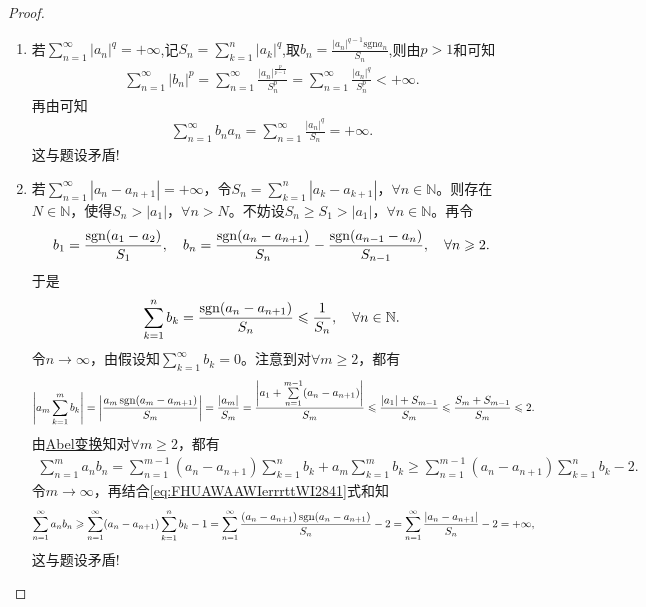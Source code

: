 \documentclass[../../main.tex]{subfiles}%
\begin{document}
\begin{proof}
\begin{enumerate}[(1)]
\item 若$\sum_{n=1}^{\infty}{| a_n |^q}=+\infty$,记$S_n=\sum_{k=1}^n{| a_k |^q}$,取$b_n=\frac{| a_n |^{q-1}\mathrm{sgn} a_n}{S_n}$,则由$p>1$和可知
\begin{align*}
\sum_{n=1}^{\infty}{| b_n |^p}=\sum_{n=1}^{\infty}{\frac{| a_n |^{\frac{p}{p-1}}}{S_{n}^{p}}}=\sum_{n=1}^{\infty}{\frac{| a_n |^q}{S_{n}^{p}}}<+\infty.
\end{align*}
再由可知
\begin{align*}
\sum_{n=1}^{\infty}{b_n a_n}=\sum_{n=1}^{\infty}{\frac{| a_n |^q}{S_n}}=+\infty.
\end{align*}
这与题设矛盾!

\item 若$\sum\limits_{n=1}^{\infty} |a_n - a_{n+1}| = +\infty$，令$S_n = \sum\limits_{k=1}^{n} |a_k - a_{k+1}|$，$\forall n\in \mathbb{N}$。则存在$N\in \mathbb{N}$，使得$S_n > |a_1|$，$\forall n > N$。不妨设$S_n \geqslant S_1 > |a_1|$，$\forall n\in \mathbb{N}$。再令
\begin{align*}
b_1 = \frac{\operatorname{sgn} (a_1 - a_2)}{S_1},\quad b_n = \frac{\operatorname{sgn} (a_n - a_{n+1})}{S_n} - \frac{\operatorname{sgn} (a_{n-1} - a_n)}{S_{n-1}},\quad \forall n\geqslant 2.
\end{align*}
于是
\begin{align*}
\sum\limits_{k=1}^{n} b_k = \frac{\operatorname{sgn} (a_n - a_{n+1})}{S_n} \leqslant \frac{1}{S_n},\quad \forall n\in \mathbb{N}.
\end{align*}
令$n\to\infty$，由假设知$\sum\limits_{k=1}^{\infty} b_k = 0$。注意到对$\forall m\geqslant 2$，都有
\begin{align}
\left| a_m \sum\limits_{k=1}^{m} b_k \right| = \left| \frac{a_m \operatorname{sgn} (a_m - a_{m+1})}{S_m} \right| = \frac{|a_m|}{S_m} = \frac{\left| a_1 + \sum\limits_{n=1}^{m-1} (a_n - a_{n+1}) \right|}{S_m} \leqslant \frac{|a_1| + S_{m-1}}{S_m} \leqslant\frac{S_m + S_{m-1}}{S_m}  \leqslant 2.
\label{eq:FHUAWAAWIerrrttWI2841}
\end{align}
由\hyperref[theorem:Abel变换]{Abel变换}知对$\forall m\geqslant 2$，都有
\begin{align*}
\sum\limits_{n=1}^{m} a_n b_n = \sum\limits_{n=1}^{m-1} (a_n - a_{n+1}) \sum\limits_{k=1}^{n} b_k + a_m \sum\limits_{k=1}^{m} b_k \geqslant \sum\limits_{n=1}^{m-1} (a_n - a_{n+1}) \sum\limits_{k=1}^{n} b_k - 2.
\end{align*}
令$m\to\infty$，再结合\eqref{eq:FHUAWAAWIerrrttWI2841}式和知
\begin{align*}
\sum\limits_{n=1}^{\infty} a_n b_n \geqslant \sum\limits_{n=1}^{\infty} (a_n - a_{n+1}) \sum\limits_{k=1}^{n} b_k - 1 = \sum\limits_{n=1}^{\infty} \frac{(a_n - a_{n+1}) \operatorname{sgn} (a_n - a_{n+1})}{S_n} - 2 = \sum\limits_{n=1}^{\infty} \frac{|a_n - a_{n+1}|}{S_n} - 2 = +\infty,
\end{align*}
这与题设矛盾!
\end{enumerate}

\end{proof}
\end{document}
